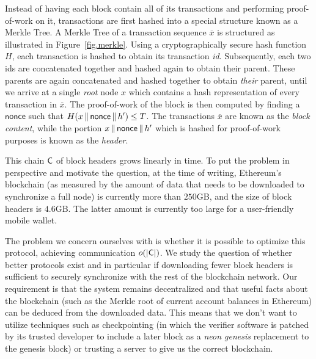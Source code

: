 Instead of having each block contain all of its
transactions and performing proof-of-work on it, transactions are first hashed
into a special structure known as a Merkle Tree. A Merkle Tree of a transaction
sequence $\overline{x}$ is structured as illustrated in Figure~\ref{fig.merkle}. Using a cryptographically
secure hash function $H$, each transaction is hashed to obtain its transaction
\emph{id}. Subsequently, each two ids are concatenated together and hashed again
to obtain their parent. These parents are again concatenated and hashed
together to obtain \emph{their} parent, until we arrive at a single \emph{root}
node $x$ which contains a hash representation of every transaction in
$\overline{x}$. The proof-of-work of the block is then computed by finding a
$\textsf{nonce}$ such that $H(x \,\|\, \textsf{nonce} \,\|\, h') \leq T$. The
transactions $\overline{x}$ are known as the \emph{block content}, while the
portion $x \,\|\, \textsf{nonce} \,\|\, h'$ which is hashed for proof-of-work
purposes is known as the \emph{header}.

This chain $\mathsf{C}$ of block headers grows linearly in time. To put the problem
in perspective and motivate the question, at the time of writing, Ethereum's
blockchain (as measured by the amount of data that needs to be downloaded to
synchronize a full node) is currently more than $250$GB, and the size of block
headers is $4.6$GB. The latter amount is currently too large for a user-friendly
mobile wallet.

The problem we concern ourselves with is whether it is possible to optimize this
protocol, achieving communication $o(|\mathsf{C}|)$. We study the question of
whether better protocols exist and in particular if downloading fewer block
headers is sufficient to securely synchronize with the rest of the blockchain
network. Our requirement is that the system remains decentralized and that
useful facts about the blockchain (such as the Merkle root of current account
balances in Ethereum) can be deduced from the downloaded data. This means that
we don't want to utilize techniques such as checkpointing (in which the verifier
software is patched by its trusted developer to include a later block as
a \emph{neon genesis} replacement to the genesis block) or trusting a server to
give us the correct blockchain.

